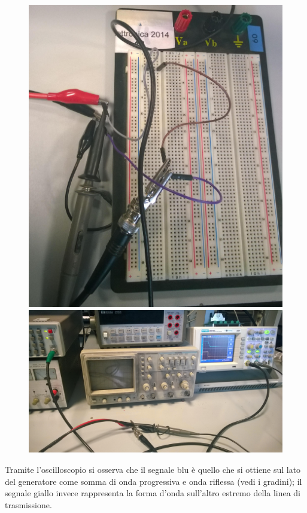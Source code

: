 \documentclass[a4paper]{article}
\begin{document}
\begin{itemize}
\begin{itemize}
\begin{figure}[H]
\centering
    \includegraphics[scale=0.08]{foto/foto8.jpg}
  \endminipage
    \includegraphics[scale=0.07]{foto/foto6.jpg}
  \endminipage
\end{figure}

Tramite l'oscilloscopio si osserva che il segnale blu è quello che si ottiene sul lato del generatore come somma di onda progressiva e onda riflessa (vedi i gradini);
il segnale giallo invece rappresenta la forma d'onda sull'altro estremo della linea di trasmissione.


\end{itemize}
\end{itemize}
\end{document}
